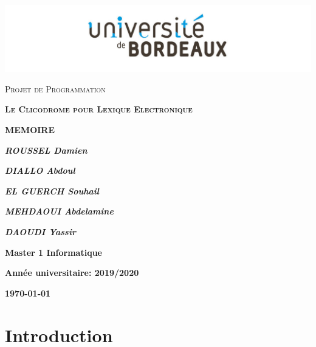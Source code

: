 \documentclass[a4paper, 12pt]{article}
\begin{document}
\begin{titlepage}
	\centering
	\includegraphics[width=1\textwidth]{univ.jpg}\par\vspace{1cm}
	{\scshape\LARGE  Projet de Programmation \par}
	\vspace{1cm}
	{\scshape\Large\bfseries Le Clicodrome pour Lexique Electronique \par}
	\vspace{1.5cm}
	{\huge\bfseries MEMOIRE \par}
	\vspace{1.5cm}
	
	
	{\Large\itshape\bfseries ROUSSEL Damien \par}
	\vspace{0.2cm}
	{\Large\itshape\bfseries DIALLO Abdoul  \par}	
	\vspace{0.2cm}
	{\Large\itshape\bfseries EL GUERCH Souhail\par}
	\vspace{0.2cm}
	{\Large\itshape\bfseries MEHDAOUI Abdelamine \par}
	\vspace{0.2cm}
	{\Large\itshape\bfseries DAOUDI Yassir\par}

	\vspace{5cm}
	
	
	{\Large\bfseries Master 1 Informatique   \par}
	\vspace{0.5cm}
	{\Large\bfseries Année universitaire: 2019/2020   \par}
	
	
	\vspace{0.5cm}
	{\large\bfseries \today\par}
\end{titlepage}

\tableofcontents
\newpage
\listoffigures
\newpage

\section{Introduction}
\end{document}
